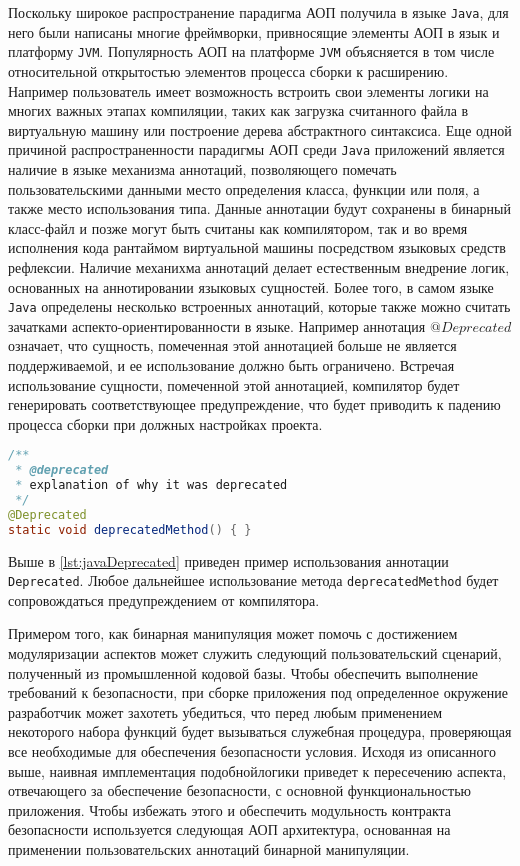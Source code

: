 Поскольку широкое распространение парадигма АОП получила в языке \texttt{Java}, для него были написаны многие фреймворки, привносящие элементы АОП в язык и платформу \texttt{JVM}. Популярность АОП на платформе \texttt{JVM} объясняется в том числе относительной открытостью элементов процесса сборки к расширению. Например пользователь имеет возможность встроить свои элементы логики на многих важных этапах компиляции, таких как загрузка считанного файла в виртуальную машину или построение дерева абстрактного синтаксиса. Еще одной причиной распространенности парадигмы АОП среди \texttt{Java} приложений является наличие в языке механизма аннотаций, позволяющего помечать пользовательскими данными место определения класса, функции или поля, а также место использования типа. Данные аннотации будут сохранены в бинарный класс-файл и позже могут быть считаны как компилятором, так и во время исполнения кода рантаймом виртуальной машины посредством языковых средств рефлексии. Наличие механихма аннотаций делает естественным внедрение логик, основанных на аннотировании языковых сущностей. Более того, в самом языке \texttt{Java} определены несколько встроенных аннотаций, которые также можно считать зачатками аспекто-ориентированности в языке. Например аннотация $@Deprecated$ означает, что сущность, помеченная этой аннотацией больше не является поддерживаемой, и ее использование должно быть ограничено. Встречая использование сущности, помеченной этой аннотацией, компилятор будет генерировать соответствующее предупреждение, что будет приводить к падению процесса сборки при должных настройках проекта.

\begin{lstlisting}[language=Java, caption=Пример использования аннотации \texttt{Deprecated}, label=lst:javaDeprecated]
/**
 * @deprecated
 * explanation of why it was deprecated
 */
@Deprecated
static void deprecatedMethod() { }
\end{lstlisting}

Выше в \autoref{lst:javaDeprecated} приведен пример использования аннотации \texttt{Deprecated}. Любое дальнейшее использование метода \texttt{deprecatedMethod} будет сопровождаться предупреждением от компилятора.

Примером того, как бинарная манипуляция может помочь с достижением модуляризации аспектов может служить следующий пользовательский сценарий, полученный из промышленной кодовой базы. Чтобы обеспечить выполнение требований к безопасности, при сборке приложения под определенное окружение разработчик может захотеть убедиться, что перед любым применением некоторого набора функций будет вызываться служебная процедура, проверяющая все необходимые для обеспечения безопасности условия. Исходя из описанного выше, наивная имплементация подобнойлогики приведет к пересечению аспекта, отвечающего за обеспечение безопасности, с основной функциональностью приложения. Чтобы избежать этого и обеспечить модульность контракта безопасности используется следующая АОП архитектура, основанная на применении пользовательских аннотаций бинарной манипуляции.

